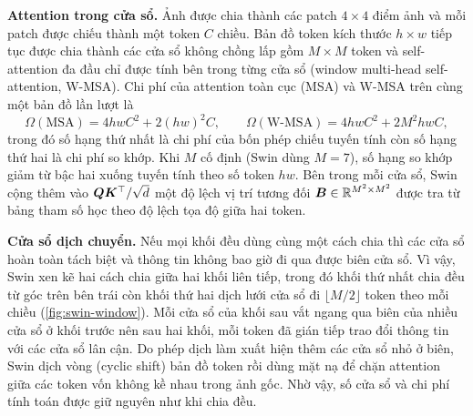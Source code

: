 \textbf{Attention trong cửa sổ.} Ảnh được chia thành các patch $4 \times 4$ điểm ảnh và mỗi patch được chiếu thành một token $C$ chiều. Bản đồ token kích thước $h \times w$ tiếp tục được chia thành các cửa sổ không chồng lấp gồm $M \times M$ token và self-attention đa đầu chỉ được tính bên trong từng cửa sổ (window multi-head self-attention, W-MSA). Chi phí của attention toàn cục (MSA) và W-MSA trên cùng một bản đồ lần lượt là
\begin{equation}
\Omega(\mathrm{MSA}) = 4hwC^2 + 2(hw)^2C, \qquad
\Omega(\mathrm{W\text{-}MSA}) = 4hwC^2 + 2M^2hwC,
\label{eq:swin-cost}
\end{equation}
trong đó số hạng thứ nhất là chi phí của bốn phép chiếu tuyến tính còn số hạng thứ hai là chi phí so khớp. Khi $M$ cố định (Swin dùng $M = 7$), số hạng so khớp giảm từ bậc hai xuống tuyến tính theo số token $hw$. Bên trong mỗi cửa sổ, Swin cộng thêm vào $\bm{Q}\bm{K}^{\top}/\sqrt{d}$ một độ lệch vị trí tương đối $\bm{B} \in \mathbb{R}^{M^2 \times M^2}$ được tra từ bảng tham số học theo độ lệch tọa độ giữa hai token.

\textbf{Cửa sổ dịch chuyển.} Nếu mọi khối đều dùng cùng một cách chia thì các cửa sổ hoàn toàn tách biệt và thông tin không bao giờ đi qua được biên cửa sổ. Vì vậy, Swin xen kẽ hai cách chia giữa hai khối liên tiếp, trong đó khối thứ nhất chia đều từ góc trên bên trái còn khối thứ hai dịch lưới cửa sổ đi $\lfloor M/2 \rfloor$ token theo mỗi chiều (\cref{fig:swin-window}). Mỗi cửa sổ của khối sau vắt ngang qua biên của nhiều cửa sổ ở khối trước nên sau hai khối, mỗi token đã gián tiếp trao đổi thông tin với các cửa sổ lân cận. Do phép dịch làm xuất hiện thêm các cửa sổ nhỏ ở biên, Swin dịch vòng (cyclic shift) bản đồ token rồi dùng mặt nạ để chặn attention giữa các token vốn không kề nhau trong ảnh gốc. Nhờ vậy, số cửa sổ và chi phí tính toán được giữ nguyên như khi chia đều.

